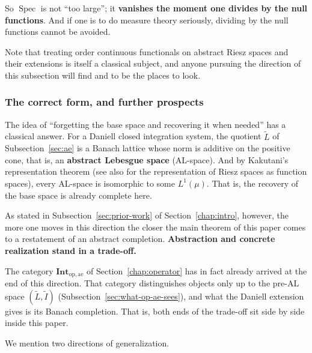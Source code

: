 \noindent
So $\operatorname{Spec}$ is not ``too large''; it
\textbf{vanishes the moment one divides by the null functions}.
And if one is to do measure theory seriously, dividing by the null functions
cannot be avoided.

Note that treating order continuous functionals on abstract Riesz spaces and
their extensions is itself a classical subject, and anyone pursuing the
direction of this subsection will find \cite{LuxemburgZaanen} and
\cite{FremlinTRS} to be the places to look.

\subsubsection{The correct form, and further prospects}

\begin{remark}
  The idea of ``forgetting the base space and recovering it when needed'' has a
  classical answer.
  For a Daniell closed integration system, the quotient $\widetilde{L}$ of
  Subsection~\ref{sec:ae} is a Banach lattice whose norm is additive on the
  positive cone, that is, an \textbf{abstract Lebesgue space} (AL-space).
  And by Kakutani's representation theorem \cite{Kakutani} (see also
  \cite{Yosida} for the representation of Riesz spaces as function spaces),
  every AL-space is isomorphic to some $L^1(\mu)$.
  That is, the recovery of the base space is already complete here.

  As stated in Subsection~\ref{sec:prior-work} of
  Section~\ref{chap:intro}, however, the more one moves in this direction the
  closer the main theorem of this paper comes to a restatement of an abstract
  completion.
  \textbf{Abstraction and concrete realization stand in a trade-off.}

  The category $\mathbf{Int}_{\mathrm{op},\mathrm{ae}}$ of
  Section~\ref{chap:operator} has in fact already arrived at the end of this
  direction.
  That category distinguishes objects only up to the pre-AL space
  $(\widetilde{L},\widetilde{I})$
  (Subsection~\ref{sec:what-op-ae-sees}), and what the Daniell extension gives
  is its Banach completion.
  That is, both ends of the trade-off sit side by side inside this paper.
\end{remark}

We mention two directions of generalization.


